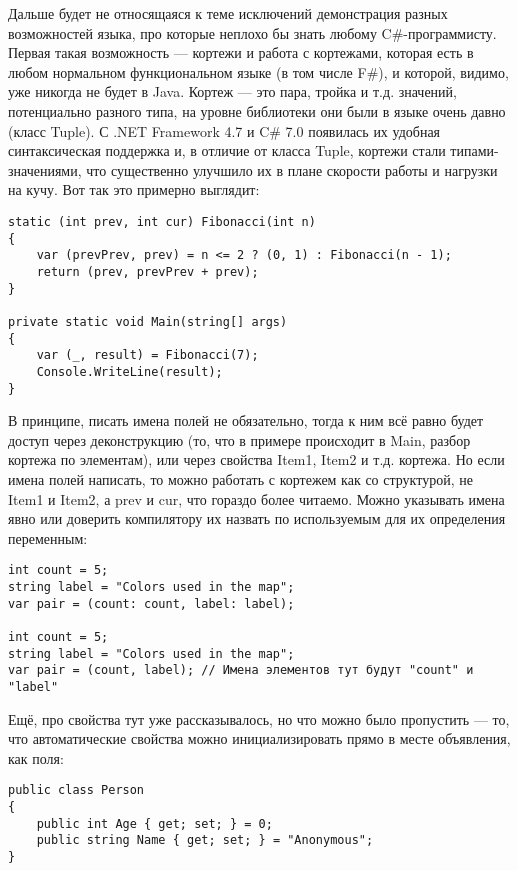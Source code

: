 \documentclass{../../text-style}
\begin{document}
Дальше будет не относящаяся к теме исключений демонстрация разных возможностей языка, про которые неплохо бы знать любому C\#-программисту. Первая такая возможность --- кортежи и работа с кортежами, которая есть в любом нормальном функциональном языке (в том числе F\#), и которой, видимо, уже никогда не будет в Java. Кортеж --- это пара, тройка и т.д. значений, потенциально разного типа, на уровне библиотеки они были в языке очень давно (класс Tuple). С .NET Framework 4.7 и C\# 7.0 появилась их удобная синтаксическая поддержка и, в отличие от класса Tuple, кортежи стали типами-значениями, что существенно улучшило их в плане скорости работы и нагрузки на кучу. Вот так это примерно выглядит:

\begin{verbatim}
static (int prev, int cur) Fibonacci(int n)
{
    var (prevPrev, prev) = n <= 2 ? (0, 1) : Fibonacci(n - 1);
    return (prev, prevPrev + prev);
}

private static void Main(string[] args)
{
    var (_, result) = Fibonacci(7);
    Console.WriteLine(result);
}
\end{verbatim}

В принципе, писать имена полей не обязательно, тогда к ним всё равно будет доступ через деконструкцию (то, что в примере происходит в Main, разбор кортежа по элементам), или через свойства Item1, Item2 и т.д. кортежа. Но если имена полей написать, то можно работать с кортежем как со структурой, не Item1 и Item2, а prev и cur, что гораздо более читаемо. Можно указывать имена явно или доверить компилятору их назвать по используемым для их определения переменным:

\begin{verbatim}
int count = 5;
string label = "Colors used in the map";
var pair = (count: count, label: label);

int count = 5;
string label = "Colors used in the map";
var pair = (count, label); // Имена элементов тут будут "count" и "label"
\end{verbatim}

Ещё, про свойства тут уже рассказывалось, но что можно было пропустить --- то, что автоматические свойства можно инициализировать прямо в месте объявления, как поля:

\begin{verbatim}
public class Person
{
    public int Age { get; set; } = 0;
    public string Name { get; set; } = "Anonymous";
}
\end{verbatim}
\end{document}
